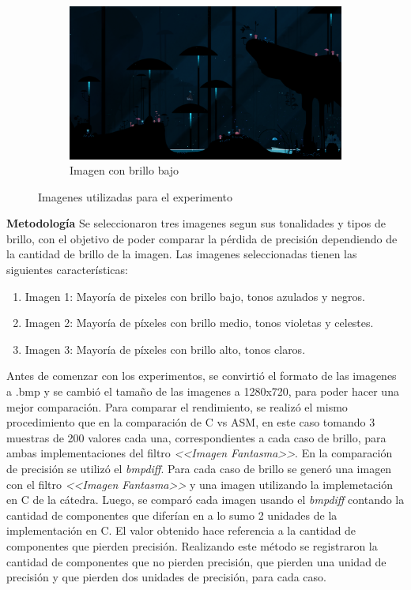 \documentclass[a4paper]{article}
\begin{document}
\begin{figure}[h]
\begin{subfigure}[b]{0.3 \textwidth}
		\includegraphics[width=\textwidth]{img/oscura2.png}
		\caption{Imagen con brillo bajo}
	\end{subfigure}
	\caption{Imagenes utilizadas para el experimento}
\end{figure}

\newpage
\justify
\textbf{Metodología}
\justify
Se seleccionaron tres imagenes segun sus tonalidades y tipos de brillo, con el objetivo de poder comparar la pérdida de precisión dependiendo de la cantidad de brillo de la imagen. 
\justify
Las imagenes seleccionadas tienen las siguientes características:
\begin{enumerate}
	\item Imagen 1: Mayoría de pixeles con brillo bajo, tonos azulados y negros.
	\item Imagen 2: Mayoría de píxeles con brillo medio, tonos violetas y celestes.
	\item Imagen 3: Mayoría de píxeles con brillo alto, tonos claros. 
\end{enumerate}
\justify
Antes de comenzar con los experimentos, se convirtió el formato de las imagenes a .bmp y se cambió el tamaño de las imagenes a 1280x720, para poder hacer una mejor comparación.
\justify
Para comparar el rendimiento, se realizó el mismo procedimiento que en la comparación de C vs ASM, en este caso tomando 3 muestras de 200 valores cada una, correspondientes a cada caso de brillo, para ambas implementaciones del filtro \textit{<<Imagen Fantasma>>}. 
\justify
En la comparación de precisión se utilizó el \textit{bmpdiff}. Para cada caso de brillo se generó una imagen con el filtro \textit{<<Imagen Fantasma>>}  y una imagen utilizando la implemetación en C de la cátedra. Luego, se comparó cada imagen usando el \textit{bmpdiff} contando la cantidad de componentes que diferían en a lo sumo 2 unidades de la implementación en C. El valor obtenido hace referencia a la cantidad de componentes que pierden precisión.
\justify
Realizando este método se registraron la cantidad de componentes que 
no pierden precisión, que pierden una unidad de precisión y que pierden dos unidades de precisión, para cada caso.
\end{document}
